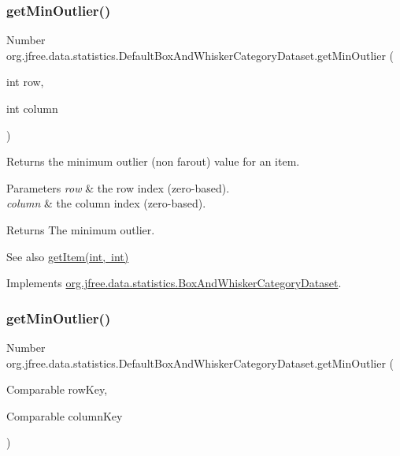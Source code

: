 \subsubsection{\texorpdfstring{get\+Min\+Outlier()}{getMinOutlier()}\hspace{0.1cm}{\footnotesize\ttfamily [1/2]}}
{\footnotesize\ttfamily Number org.\+jfree.\+data.\+statistics.\+Default\+Box\+And\+Whisker\+Category\+Dataset.\+get\+Min\+Outlier (\begin{DoxyParamCaption}\item[{int}]{row,  }\item[{int}]{column }\end{DoxyParamCaption})}

Returns the minimum outlier (non farout) value for an item.


\begin{DoxyParams}{Parameters}
{\em row} & the row index (zero-\/based). \\
\hline
{\em column} & the column index (zero-\/based).\\
\hline
\end{DoxyParams}
\begin{DoxyReturn}{Returns}
The minimum outlier.
\end{DoxyReturn}
\begin{DoxySeeAlso}{See also}
\mbox{\hyperlink{classorg_1_1jfree_1_1data_1_1statistics_1_1_default_box_and_whisker_category_dataset_a85c944b06e4337059ea728b3a744e2a9}{get\+Item(int, int)}} 
\end{DoxySeeAlso}


Implements \mbox{\hyperlink{interfaceorg_1_1jfree_1_1data_1_1statistics_1_1_box_and_whisker_category_dataset_a8a593c6f2cde6255302a043f2460a71e}{org.\+jfree.\+data.\+statistics.\+Box\+And\+Whisker\+Category\+Dataset}}.

\mbox{\label{classorg_1_1jfree_1_1data_1_1statistics_1_1_default_box_and_whisker_category_dataset_a58596fb253f18d48239573568d9d4393}} 
\subsubsection{\texorpdfstring{get\+Min\+Outlier()}{getMinOutlier()}\hspace{0.1cm}{\footnotesize\ttfamily [2/2]}}
{\footnotesize\ttfamily Number org.\+jfree.\+data.\+statistics.\+Default\+Box\+And\+Whisker\+Category\+Dataset.\+get\+Min\+Outlier (\begin{DoxyParamCaption}\item[{Comparable}]{row\+Key,  }\item[{Comparable}]{column\+Key }\end{DoxyParamCaption})}

